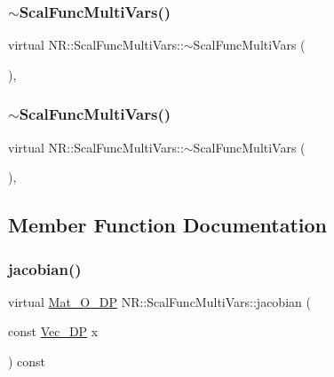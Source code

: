 \subsubsection{\texorpdfstring{$\sim$ScalFuncMultiVars()}{~ScalFuncMultiVars()}\hspace{0.1cm}{\footnotesize\ttfamily [1/2]}}
{\footnotesize\ttfamily virtual N\+R\+::\+Scal\+Func\+Multi\+Vars\+::$\sim$\+Scal\+Func\+Multi\+Vars (\begin{DoxyParamCaption}{ }\end{DoxyParamCaption})\hspace{0.3cm}{\ttfamily [inline]}, {\ttfamily [virtual]}}

\mbox{\label{classNR_1_1ScalFuncMultiVars_a324caa9cf6de53c9eb1f532443030188}} 
\subsubsection{\texorpdfstring{$\sim$ScalFuncMultiVars()}{~ScalFuncMultiVars()}\hspace{0.1cm}{\footnotesize\ttfamily [2/2]}}
{\footnotesize\ttfamily virtual N\+R\+::\+Scal\+Func\+Multi\+Vars\+::$\sim$\+Scal\+Func\+Multi\+Vars (\begin{DoxyParamCaption}{ }\end{DoxyParamCaption})\hspace{0.3cm}{\ttfamily [inline]}, {\ttfamily [virtual]}}



\subsection{Member Function Documentation}
\mbox{\label{classNR_1_1ScalFuncMultiVars_ab8dd80ced0a7b26584bde4e34444c04a}} 
\subsubsection{\texorpdfstring{jacobian()}{jacobian()}\hspace{0.1cm}{\footnotesize\ttfamily [1/2]}}
{\footnotesize\ttfamily virtual \mbox{\hyperlink{namespaceNR_adc1f8da33094b6bbeb1f5f899515ce54}{Mat\+\_\+\+O\+\_\+\+DP}} N\+R\+::\+Scal\+Func\+Multi\+Vars\+::jacobian (\begin{DoxyParamCaption}\item[{const \mbox{\hyperlink{namespaceNR_a115a3196718c98e8e2562d80b06c23c5}{Vec\+\_\+\+DP}}}]{x }\end{DoxyParamCaption}) const\hspace{0.3cm}{\ttfamily [pure virtual]}}

